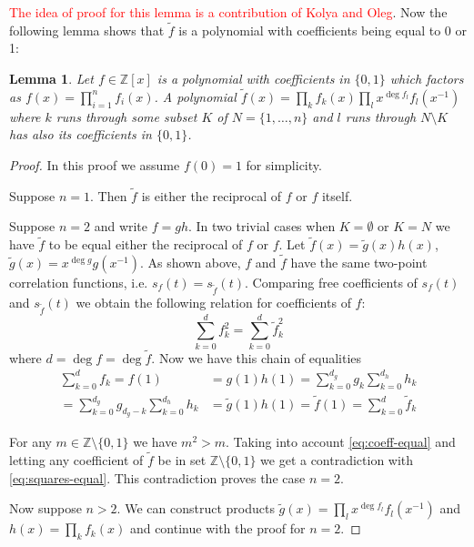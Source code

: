 \documentclass[12pt, a4paper]{article}
\newtheorem{lemma}{Lemma}
\begin{document}
\textcolor{red}{The idea of proof for this lemma is a contribution of Kolya and
  Oleg}.
Now the following lemma shows that $\tilde{f}$ is a polynomial with coefficients
being equal to 0 or 1:
\begin{lemma}
  Let $f \in \mathbb{Z}[x]$ is a polynomial with coefficients in $\{0, 1\}$
  which factors as $f(x) = \prod_{i=1}^n f_i(x)$. A polynomial
  $\tilde{f}(x) = \prod_k f_k(x) \prod_l x^{\deg f_l} f_l(x^{-1})$ where $k$
  runs through some subset $K$ of $N = \{1, \dots, n\}$ and $l$ runs through
  $N \setminus K$ has also its coefficients in $\{0, 1\}$.
\end{lemma}
\begin{proof}
  In this proof we assume $f(0) = 1$ for simplicity.

  Suppose $n = 1$. Then $\tilde{f}$ is either the reciprocal of $f$ or $f$ itself.

  Suppose $n = 2$ and write $f = gh$. In two trivial cases when $K = \emptyset$
  or $K = N$ we have $\tilde{f}$ to be equal either the reciprocal of $f$ or
  $f$. Let $\tilde{f}(x) = \tilde{g}(x)h(x)$,
  $\tilde{g}(x) = x^{\deg g}g(x^{-1})$. As shown above, $f$ and $\tilde{f}$ have
  the same two-point correlation functions, i.e.
  $s_f(t) = s_{\tilde{f}}(t)$. Comparing free coefficients of $s_f(t)$ and
  $s_{\tilde{f}}(t)$ we obtain the following relation for coefficients of $f$:
  \begin{equation}
    \sum_{k=0}^d f_k^2 = \sum_{k=0}^d \tilde{f}_k^2
    \label{eq:squares-equal}
  \end{equation}
  where $d = \deg f = \deg \tilde{f}$. Now we have this chain of equalities
  \begin{equation}
    \begin{aligned}
    \sum_{k=0}^d f_k = f(1) &= g(1) h(1) = \sum_{k=0}^{d_g} g_k \sum_{k=0}^{d_h} h_k \\
    = \sum_{k=0}^{d_g} g_{d_g-k} \sum_{k=0}^{d_h} h_k &= \tilde{g}(1) h(1) =
    \tilde{f}(1) = \sum_{k=0}^d \tilde{f}_k
    \end{aligned}
    \label{eq:coeff-equal}
  \end{equation}

  For any $m \in \mathbb{Z} \setminus \{0, 1\}$ we have $m^2 > m$. Taking into
  account \cref{eq:coeff-equal} and letting any coefficient of $\tilde{f}$ be
  in set $\mathbb{Z} \setminus \{0, 1\}$ we get a contradiction with
  \cref{eq:squares-equal}. This contradiction proves the case $n = 2$.

  Now suppose $n > 2$. We can construct products
  $\tilde{g}(x) = \prod_l x^{\deg f_l }f_l(x^{-1})$ and $h(x) = \prod_k f_k(x)$
  and continue with the proof for $n = 2$.
\end{proof}
\end{document}
